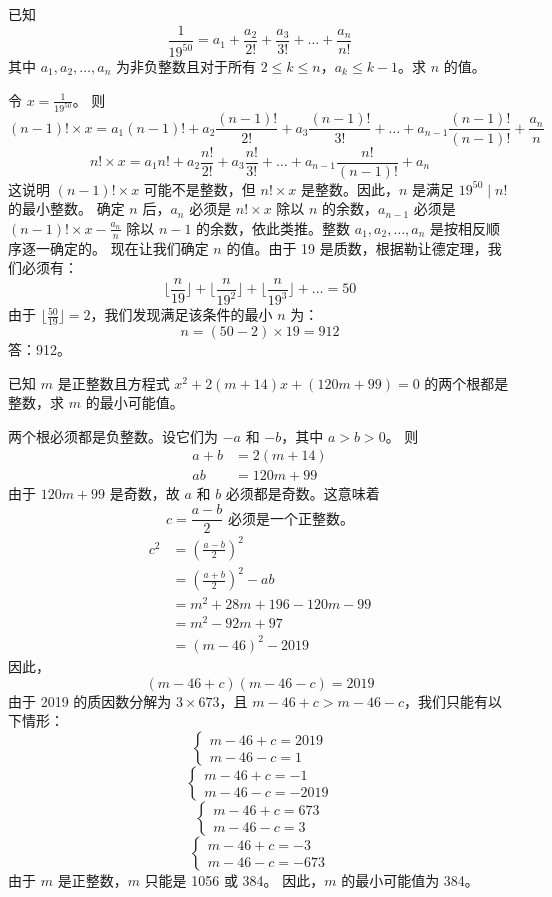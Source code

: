 \begin{questions}
\question 已知
\[
\frac{1}{19^{50}} = a_1 + \frac{a_2}{2!} + \frac{a_3}{3!} + \dots + \frac{a_n}{n!}
\]
其中 $a_1, a_2, \dots, a_n$ 为非负整数且对于所有 $2 \le k \le n$，$a_k \le k-1$。求 $n$ 的值。

\begin{solution}
令 $x = \frac{1}{19^{50}}$。
则
\[
(n-1)! \times x = a_1(n-1)! + a_2 \frac{(n-1)!}{2!} + a_3 \frac{(n-1)!}{3!} + \dots + a_{n-1} \frac{(n-1)!}{(n-1)!} + \frac{a_n}{n}
\]
\[
n! \times x = a_1 n! + a_2 \frac{n!}{2!} + a_3 \frac{n!}{3!} + \dots + a_{n-1} \frac{n!}{(n-1)!} + a_n
\]
这说明 $(n-1)! \times x$ 可能不是整数，但 $n! \times x$ 是整数。因此，$n$ 是满足 $19^{50} \mid n!$ 的最小整数。
确定 $n$ 后，$a_n$ 必须是 $n! \times x$ 除以 $n$ 的余数，$a_{n-1}$ 必须是 $(n-1)! \times x - \frac{a_n}{n}$ 除以 $n-1$ 的余数，依此类推。整数 $a_1, a_2, \dots, a_n$ 是按相反顺序逐一确定的。
现在让我们确定 $n$ 的值。由于 19 是质数，根据勒让德定理，我们必须有：
\[
\lfloor \frac{n}{19} \rfloor + \lfloor \frac{n}{19^2} \rfloor + \lfloor \frac{n}{19^3} \rfloor + \dots = 50
\]
由于 $\lfloor \frac{50}{19} \rfloor = 2$，我们发现满足该条件的最小 $n$ 为：
\[
n = (50 - 2) \times 19 = 912
\]
答：912。
\end{solution}

\question 已知 $m$ 是正整数且方程式 $x^2 + 2(m + 14)x + (120m + 99) = 0$ 的两个根都是整数，求 $m$ 的最小可能值。

\begin{solution}
两个根必须都是负整数。设它们为 $-a$ 和 $-b$，其中 $a > b > 0$。
则
\begin{align}
a + b &= 2(m + 14) \\
ab &= 120m + 99
\end{align}
由于 $120m + 99$ 是奇数，故 $a$ 和 $b$ 必须都是奇数。这意味着
\[
c = \frac{a - b}{2} \text{ 必须是一个正整数。}
\]
\begin{align}
c^2 &= \left( \frac{a - b}{2} \right)^2 \\
&= \left( \frac{a + b}{2} \right)^2 - ab \\
&= m^2 + 28m + 196 - 120m - 99 \\
&= m^2 - 92m + 97 \\
&= (m - 46)^2 - 2019 
\end{align}
因此，
\[
(m - 46 + c)(m - 46 - c) = 2019 
\]
由于 2019 的质因数分解为 $3 \times 673$，且 $m - 46 + c > m - 46 - c$，我们只能有以下情形：
\[
\begin{cases} m - 46 + c = 2019 \\ m - 46 - c = 1 \end{cases}
\]
\[
\begin{cases} m - 46 + c = -1 \\ m - 46 - c = -2019 \end{cases}
\]
\[
\begin{cases} m - 46 + c = 673 \\ m - 46 - c = 3 \end{cases}
\]
\[
\begin{cases} m - 46 + c = -3 \\ m - 46 - c = -673 \end{cases}
\]
由于 $m$ 是正整数，$m$ 只能是 1056 或 384。
因此，$m$ 的最小可能值为 384。
\end{solution}


\end{questions}
